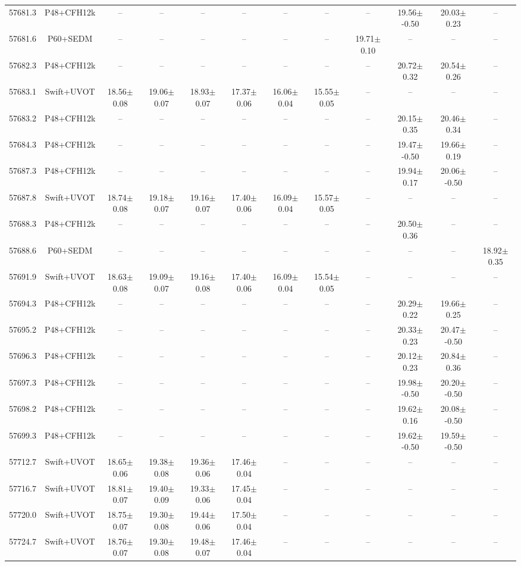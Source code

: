 \begin{tabular}{rccccccccccc}
 57681.3 & P48+CFH12k & -- & -- & -- & -- & -- & -- & -- & 19.56$\pm$-0.50 & 20.03$\pm$0.23 & --\\
 57681.6 & P60+SEDM& -- & -- & -- & -- & -- & -- & 19.71$\pm$0.10 & -- & -- & --\\
 57682.3 & P48+CFH12k & -- & -- & -- & -- & -- & -- & -- & 20.72$\pm$0.32 & 20.54$\pm$0.26 & --\\
 57683.1 & Swift+UVOT & 18.56$\pm$0.08 & 19.06$\pm$0.07 & 18.93$\pm$0.07 & 17.37$\pm$0.06 & 16.06$\pm$0.04 & 15.55$\pm$0.05 & -- & -- & -- & --\\
 57683.2 & P48+CFH12k & -- & -- & -- & -- & -- & -- & -- & 20.15$\pm$0.35 & 20.46$\pm$0.34 & --\\
 57684.3 & P48+CFH12k & -- & -- & -- & -- & -- & -- & -- & 19.47$\pm$-0.50 & 19.66$\pm$0.19 & --\\
 57687.3 & P48+CFH12k & -- & -- & -- & -- & -- & -- & -- & 19.94$\pm$0.17 & 20.06$\pm$-0.50 & --\\
 57687.8 & Swift+UVOT & 18.74$\pm$0.08 & 19.18$\pm$0.07 & 19.16$\pm$0.07 & 17.40$\pm$0.06 & 16.09$\pm$0.04 & 15.57$\pm$0.05 & -- & -- & -- & --\\
 57688.3 & P48+CFH12k & -- & -- & -- & -- & -- & -- & -- & 20.50$\pm$0.36 & -- & --\\
 57688.6 & P60+SEDM& -- & -- & -- & -- & -- & -- & -- & -- & -- & 18.92$\pm$0.35\\
 57691.9 & Swift+UVOT & 18.63$\pm$0.08 & 19.09$\pm$0.07 & 19.16$\pm$0.08 & 17.40$\pm$0.06 & 16.09$\pm$0.04 & 15.54$\pm$0.05 & -- & -- & -- & --\\
 57694.3 & P48+CFH12k & -- & -- & -- & -- & -- & -- & -- & 20.29$\pm$0.22 & 19.66$\pm$0.25 & --\\
 57695.2 & P48+CFH12k & -- & -- & -- & -- & -- & -- & -- & 20.33$\pm$0.23 & 20.47$\pm$-0.50 & --\\
 57696.3 & P48+CFH12k & -- & -- & -- & -- & -- & -- & -- & 20.12$\pm$0.23 & 20.84$\pm$0.36 & --\\
 57697.3 & P48+CFH12k & -- & -- & -- & -- & -- & -- & -- & 19.98$\pm$-0.50 & 20.20$\pm$-0.50 & --\\
 57698.2 & P48+CFH12k & -- & -- & -- & -- & -- & -- & -- & 19.62$\pm$0.16 & 20.08$\pm$-0.50 & --\\
 57699.3 & P48+CFH12k & -- & -- & -- & -- & -- & -- & -- & 19.62$\pm$-0.50 & 19.59$\pm$-0.50 & --\\
 57712.7 & Swift+UVOT & 18.65$\pm$0.06 & 19.38$\pm$0.08 & 19.36$\pm$0.06 & 17.46$\pm$0.04 & -- & -- & -- & -- & -- & --\\
 57716.7 & Swift+UVOT & 18.81$\pm$0.07 & 19.40$\pm$0.09 & 19.33$\pm$0.06 & 17.45$\pm$0.04 & -- & -- & -- & -- & -- & --\\
 57720.0 & Swift+UVOT & 18.75$\pm$0.07 & 19.30$\pm$0.08 & 19.44$\pm$0.06 & 17.50$\pm$0.04 & -- & -- & -- & -- & -- & --\\
 57724.7 & Swift+UVOT & 18.76$\pm$0.07 & 19.30$\pm$0.08 & 19.48$\pm$0.07 & 17.46$\pm$0.04 & -- & -- & -- & -- & -- & --\\
\end{tabular}